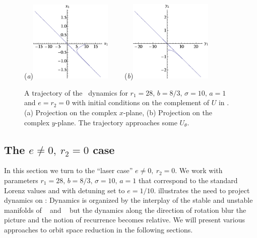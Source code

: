 \begin{figure}[t]
\begin{center}
  (\textit{a})\includegraphics[width=0.35\textwidth]{../figs/CLe0transA.eps}
~~~~(\textit{b})\includegraphics[width=0.35\textwidth]{../figs/CLe0transB.eps}
\end{center}
\caption[Transient trajectory in degenerate Complex Lorenz eq.]{ A trajectory
of the \CLe\ dynamics for $r_1=28,\, b=8/3,\, \sigma=10,\, a=1$ and $e=r_2=0$ with
initial conditions on the complement of $U$ in . (a) Projection on the
complex $x$-plane, (b) Projection on the complex $y$-plane. The trajectory
approaches some $U_\theta$.
    }
\label{fig:CLe0trans}
\end{figure}

\subsection{The $e\neq0,\ r_2=0$ case}

In this section we turn to the ``laser case'' $e\neq0,\ r_2=0$. We work with
parameters $r_1=28,\, b=8/3,\, \sigma=10,\, a=1$ that correspond
to the standard Lorenz values and with detuning set to $e=1/10$.
 illustrates the need to project dynamics on \reducedsp: Dynamics
is organized by the interplay of the stable and unstable manifolds of \eqv\ 
and \reqv\  but the dynamics along the direction of rotation blur the picture
and the notion of recurrence becomes relative. We will present various approaches
to orbit space reduction in the following sections.


